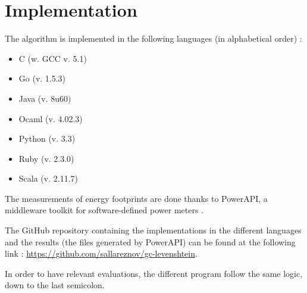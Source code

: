 \section{Implementation}
\label{sec:Implementation}
The algorithm is implemented in the following languages (in alphabetical order) :
\begin{multicols}{2}
	\begin{itemize}
		\item C (w. GCC v. 5.1)
		\item Go (v. 1.5.3)
		\item Java (v. 8u60)
		\item Ocaml (v. 4.02.3)
		\item Python (v. 3.3)
		\item Ruby (v. 2.3.0)
		\item Scala (v. 2.11.7)
	\end{itemize}
\end{multicols}

The measurements of energy footprints are done thanks to PowerAPI, a middleware toolkit for software-defined power meters \cite{powerapi-website}.

The GitHub repository containing the implementations in the different languages and the results (the files generated by PowerAPI) can be found at the following link : \url{https://github.com/sallareznov/gc-levenshtein}.

In order to have relevant evaluations, the different program follow the same logic, down to the last semicolon.

